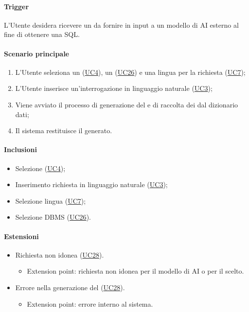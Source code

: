 \paragraph*{Trigger}
L'Utente desidera ricevere un  da fornire in input a un modello di AI esterno al fine di ottenere una  SQL.

\paragraph*{Scenario principale}
\begin{enumerate}
  \item L'Utente seleziona un (\hyperref[UC4]{UC4}), un  (\hyperref[UC26]{UC26}) e una lingua per la richiesta (\hyperref[UC7]{UC7});
  \item L'Utente inserisce un'interrogazione in linguaggio naturale (\hyperref[UC3]{UC3});
  \item Viene avviato il processo di generazione del  e di raccolta dei  dal dizionario dati;
  \item Il sistema restituisce il  generato.
\end{enumerate}

\paragraph*{Inclusioni}
\begin{itemize}
  \item Selezione  (\hyperref[UC4]{UC4});
  \item Inserimento richiesta in linguaggio naturale (\hyperref[UC3]{UC3});
  \item Selezione lingua (\hyperref[UC7]{UC7});
  \item Selezione DBMS (\hyperref[UC26]{UC26}).
\end{itemize}

\paragraph*{Estensioni}
\begin{itemize}
  \item Richiesta non idonea (\hyperref[UC28]{UC28}).
  \begin{itemize}
    \item Extension point: richiesta non idonea per il modello di AI o per il  scelto.
  \end{itemize}
  \item Errore nella generazione del  (\hyperref[UC28]{UC28}).
    \begin{itemize}
      \item Extension point: errore interno al sistema.
    \end{itemize}
\end{itemize}